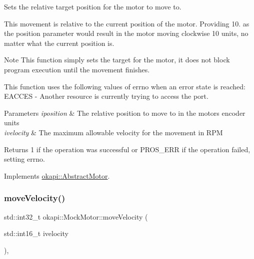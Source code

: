 Sets the relative target position for the motor to move to. 

This movement is relative to the current position of the motor. Providing 10. as the position parameter would result in the motor moving clockwise 10 units, no matter what the current position is.

\begin{DoxyNote}{Note}
This function simply sets the target for the motor, it does not block program execution until the movement finishes.
\end{DoxyNote}
This function uses the following values of errno when an error state is reached\+: E\+A\+C\+C\+ES -\/ Another resource is currently trying to access the port.


\begin{DoxyParams}{Parameters}
{\em iposition} & The relative position to move to in the motor\textquotesingle{}s encoder units \\
\hline
{\em ivelocity} & The maximum allowable velocity for the movement in R\+PM \\
\hline
\end{DoxyParams}
\begin{DoxyReturn}{Returns}
1 if the operation was successful or P\+R\+O\+S\+\_\+\+E\+RR if the operation failed, setting errno. 
\end{DoxyReturn}


Implements \mbox{\hyperlink{classokapi_1_1AbstractMotor_a5a65d70a30f536593326cb754700e240}{okapi\+::\+Abstract\+Motor}}.

\mbox{\label{classokapi_1_1MockMotor_aac646be0bcb1daa3dbe926ecd05a4353}} 
\subsubsection{\texorpdfstring{moveVelocity()}{moveVelocity()}}
{\footnotesize\ttfamily std\+::int32\+\_\+t okapi\+::\+Mock\+Motor\+::move\+Velocity (\begin{DoxyParamCaption}\item[{std\+::int16\+\_\+t}]{ivelocity }\end{DoxyParamCaption})\hspace{0.3cm}{\ttfamily [override]}, {\ttfamily [virtual]}}



